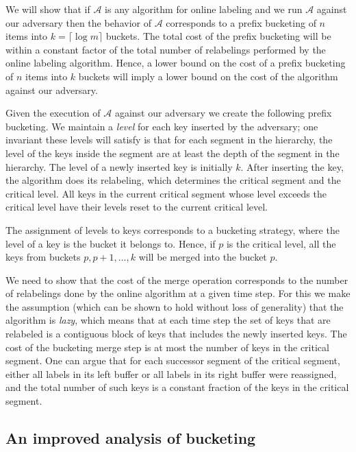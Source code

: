 \documentclass[runningheads,a4paper]{llncs}
\newcommand{\A}{\mathcal{A}}
\begin{document}
We will show that if $\A$ is any algorithm for online labeling and we run $\A$ against our adversary then
the behavior of $\A$ corresponds to a prefix bucketing of $n$ items into $k=\lceil \log m \rceil$ buckets.
The total cost of the prefix bucketing will be within a constant factor of  the total number of relabelings
performed by the online labeling algorithm. Hence, a lower bound on the cost of a prefix bucketing of $n$ items into $k$ 
buckets will imply a lower bound on the cost of the algorithm against our adversary. 

Given the execution of $\A$ against our adversary we create 
the following prefix bucketing.  We maintain a \emph{level} for each key inserted by the adversary; one invariant
these levels will satisfy is that for each segment in the hierarchy, the level of the keys inside
the segment are at least the depth of the segment in the hierarchy.
The level of a newly inserted key is initially $k$. After inserting the key, the algorithm
does its relabeling, which determines the critical segment and the critical level.
All keys in the current critical segment whose level exceeds the critical level have their levels
reset to the current critical level.   

The assignment of levels to keys corresponds to a bucketing strategy, where the level of a key is the bucket
it belongs to.   Hence, if $p$ is the critical level, all the keys from 
buckets $p,p+1,\dots,k$ will be merged into the bucket $p$. 

We need to show that 
the cost of the merge operation corresponds to the number of relabelings done by the online algorithm
at a given time step.  For this we  make the assumption (which can be shown to hold without loss of generality) that the algorithm is \emph{lazy}, which means
that at each time step the set of keys that are relabeled is a contiguous block of keys that includes
the newly inserted keys.    The cost of the bucketing merge step is at most the number of keys in
the critical segment.  One can argue that for each successor segment of the critical segment, either all labels in its left buffer
or all labels in its right buffer were reassigned, and the total number of such keys is a constant fraction of the keys
in the critical segment. 


\subsection{An improved analysis of bucketing}
\end{document}
